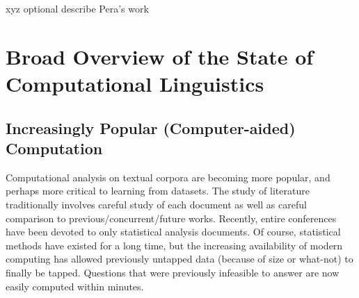 xyz optional describe Pera's work 

\section {Broad Overview of the State of Computational Linguistics}
\subsection {Increasingly Popular (Computer-aided) Computation}
Computational analysis on textual corpora are becoming more popular, and perhaps more critical to learning from datasets. The study of literature traditionally involves careful study of each document as well as careful comparison to previous/concurrent/future works. Recently, entire conferences have been devoted to only statistical analysis documents. Of course, statistical methods have existed for a long time, but the increasing availability of modern computing has allowed previously untapped data (because of size or what-not) to finally be tapped. Questions that were previously infeasible to answer are now easily computed within minutes. 